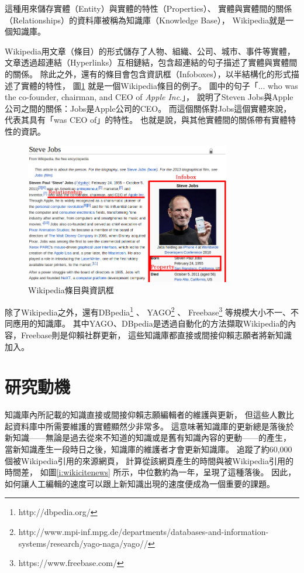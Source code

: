 這種用來儲存實體（Entity）與實體的特性（Properties）、
實體與實體間的關係（Relationships）的資料庫被稱為知識庫（Knowledge Base），
Wikipedia就是一個知識庫。

Wikipedia用文章（條目）的形式儲存了人物、組織、公司、城市、事件等實體，
文章透過超連結（Hyperlinks）互相鏈結，包含超連結的句子描述了實體與實體間的關係。
除此之外，還有的條目會包含資訊框（Infoboxes），以半結構化的形式描述了實體的特性，
圖\ref{i:wiki} 就是一個Wikipedia條目的例子。
圖中的句子「... who was the co-founder, chairman, and CEO of \emph{Apple Inc}.」，
說明了Steven Jobs與Apple公司之間的關係：Jobs是Apple公司的CEO。
而這個關係對Jobs這個實體來說，代表其具有「was CEO of」的特性。
也就是說，與其他實體間的關係帶有實體特性的資訊。

\begin{figure}[h]
    \centering
    \includegraphics[width=0.8\textwidth]{images/01-wiki-as-kb}
    \caption{Wikipedia條目與資訊框}
    \label{i:wiki}
\end{figure}

除了Wikipedia之外，還有DBpedia\footnote{http://dbpedia.org/} \citep{dbpedia}、
YAGO\footnote{http://www.mpi-inf.mpg.de/departments/databases-and-information-systems/research/yago-naga/yago//} \citep{yago}、
Freebase\footnote{https://www.freebase.com/} \citep{freebase}等規模大小不一、不同應用的知識庫。
其中YAGO、DBpedia是透過自動化的方法擷取Wikipedia的內容，Freebase則是仰賴社群更新，
這些知識庫都直接或間接仰賴志願者將新知識加入。

%
%
\section{研究動機}
知識庫內所記載的知識直接或間接仰賴志願編輯者的維護與更新，
但這些人數比起資料庫中所需要維護的實體顯然少非常多。
這意味著知識庫的更新總是落後於新知識——無論是過去從來不知道的知識或是舊有知識內容的更動——的產生，
當新知識產生一段時日之後，知識庫的維護者才會更新知識庫。
\cite{kba2012}追蹤了約60,000個被Wikipedia引用的來源網頁，
計算從該網頁產生的時間與被Wikipedia引用的時間差，
如圖\ref{i:wikicitenews} 所示，中位數約為一年，呈現了這種落後。
因此，如何讓人工編輯的速度可以跟上新知識出現的速度便成為一個重要的課題。

